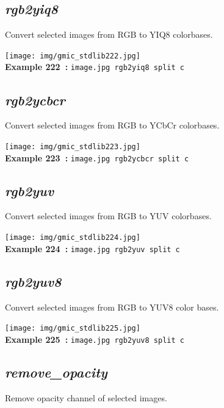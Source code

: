 \documentclass[a4paper,10.5pt,twoside]{book}
\begin{document}
\subsection{\emph{rgb2yiq8} }\vspace*{-0.7em}
Convert selected images from RGB to YIQ8 colorbases.
\begin{center}\texttt{[image: img/gmic\_stdlib222.jpg]}\\
{\footnotesize \textbf{Example 222~:} \texttt{image.jpg rgb2yiq8 split c}}
\end{center}

\subsection{\emph{rgb2ycbcr} }\vspace*{-0.7em}
Convert selected images from RGB to YCbCr colorbases.
\begin{center}\texttt{[image: img/gmic\_stdlib223.jpg]}\\
{\footnotesize \textbf{Example 223~:} \texttt{image.jpg rgb2ycbcr split c}}
\end{center}

\subsection{\emph{rgb2yuv} }\vspace*{-0.7em}
Convert selected images from RGB to YUV colorbases.
\begin{center}\texttt{[image: img/gmic\_stdlib224.jpg]}\\
{\footnotesize \textbf{Example 224~:} \texttt{image.jpg rgb2yuv split c}}
\end{center}

\subsection{\emph{rgb2yuv8} }\vspace*{-0.7em}
Convert selected images from RGB to YUV8 color bases.
\begin{center}\texttt{[image: img/gmic\_stdlib225.jpg]}\\
{\footnotesize \textbf{Example 225~:} \texttt{image.jpg rgb2yuv8 split c}}
\end{center}

\subsection{\emph{remove\_opacity} }\vspace*{-0.7em}
Remove opacity channel of selected images.
\end{document}
